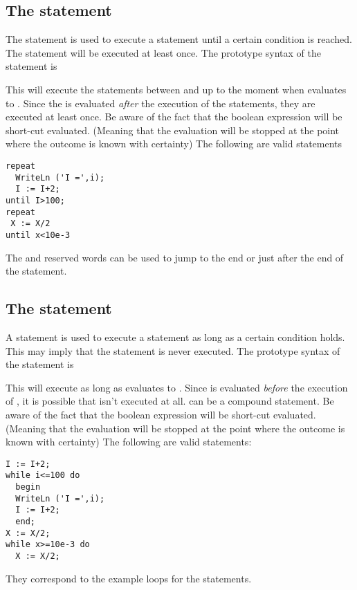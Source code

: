 \documentclass{report}
\begin{document}
\subsection{The  statement}
The  statement is used to execute a statement until a certain
condition is reached. The statement will be executed at least once.
The prototype syntax of the  statement is

This will execute the statements between  and  up to
the moment when  evaluates to .
Since the  is evaluated {\em after} the execution of the
statements, they are executed at least once.
Be aware of the fact that the boolean expression  will be
short-cut evaluated. (Meaning that the evaluation will be stopped at the
point where the outcome is known with certainty)
The following are valid  statements
\begin{verbatim}
repeat
  WriteLn ('I =',i);
  I := I+2;
until I>100;
repeat
 X := X/2
until x<10e-3
\end{verbatim}
The  and  reserved words can be used to jump to
the end or just after the end of the  statement.

\subsection{The  statement}
A  statement is used to execute a statement as long as a certain
condition holds. This may imply that the statement is never executed.
The prototype syntax of the  statement is

This will execute  as long as  evaluates to
. Since  is evaluated {\em before} the execution
of , it is possible that  isn't executed at
all.  can be a compound statement.
Be aware of the fact that the boolean expression  will be
short-cut evaluated. (Meaning that the evaluation will be stopped at the
point where the outcome is known with certainty)
The following are valid  statements:
\begin{verbatim}
I := I+2;
while i<=100 do
  begin
  WriteLn ('I =',i);
  I := I+2;
  end;
X := X/2;
while x>=10e-3 do
  X := X/2;
\end{verbatim}
They correspond to the example loops for the  statements.
\end{document}
